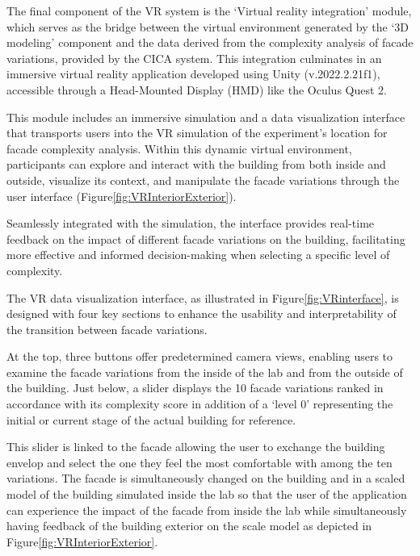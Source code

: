 

The final component of the VR system is the `Virtual reality integration' module, which serves as the bridge between the virtual environment generated by the `3D modeling' component and the data derived from the complexity analysis of facade variations, provided by the CICA system.
This integration culminates in an immersive virtual reality application developed using Unity (v.2022.2.21f1), accessible through a Head-Mounted Display (HMD) like the Oculus Quest 2.

This module includes an immersive simulation and a data visualization interface that transports users into the VR simulation of the experiment's location for facade complexity analysis.
Within this dynamic virtual environment, participants can explore and interact with the building from both inside and outside, visualize its context, and manipulate the facade variations through the user interface (Figure\ref{fig:VRInteriorExterior}).

Seamlessly integrated with the simulation, the interface provides real-time feedback on the impact of different facade variations on the building, facilitating more effective and informed decision-making when selecting a specific level of complexity.


The VR data visualization interface, as illustrated in Figure\ref{fig:VRinterface}, is designed with four key sections to enhance the usability and interpretability of the transition between facade variations.


At the top, three buttons offer predetermined camera views, enabling users to examine the facade variations from the inside of the lab and from the outside of the building.
Just below, a slider displays the 10 facade variations ranked in accordance with its complexity score in addition of a `level 0' representing the initial or current stage of the actual building for reference.

This slider is linked to the facade allowing the user to exchange the building envelop and select the one they feel the most comfortable with among the ten variations.
The facade is simultaneously changed on the building and in a scaled model of the building simulated inside the lab so that the user of the application can experience the impact of the facade from inside the lab while simultaneously having feedback of the building exterior on the scale model as depicted in Figure\ref{fig:VRInteriorExterior}.

